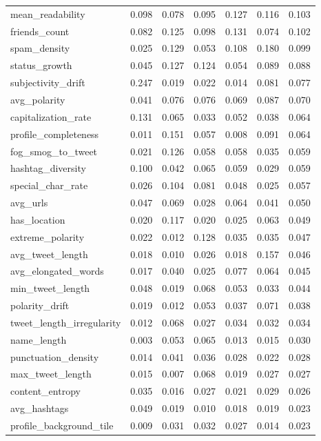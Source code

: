 \begin{tabular}{lrrrrrr}
mean_readability & 0.098 & 0.078 & 0.095 & 0.127 & 0.116 & 0.103 \\
friends_count & 0.082 & 0.125 & 0.098 & 0.131 & 0.074 & 0.102 \\
spam_density & 0.025 & 0.129 & 0.053 & 0.108 & 0.180 & 0.099 \\
status_growth & 0.045 & 0.127 & 0.124 & 0.054 & 0.089 & 0.088 \\
subjectivity_drift & 0.247 & 0.019 & 0.022 & 0.014 & 0.081 & 0.077 \\
avg_polarity & 0.041 & 0.076 & 0.076 & 0.069 & 0.087 & 0.070 \\
capitalization_rate & 0.131 & 0.065 & 0.033 & 0.052 & 0.038 & 0.064 \\
profile_completeness & 0.011 & 0.151 & 0.057 & 0.008 & 0.091 & 0.064 \\
fog_smog_to_tweet & 0.021 & 0.126 & 0.058 & 0.058 & 0.035 & 0.059 \\
hashtag_diversity & 0.100 & 0.042 & 0.065 & 0.059 & 0.029 & 0.059 \\
special_char_rate & 0.026 & 0.104 & 0.081 & 0.048 & 0.025 & 0.057 \\
avg_urls & 0.047 & 0.069 & 0.028 & 0.064 & 0.041 & 0.050 \\
has_location & 0.020 & 0.117 & 0.020 & 0.025 & 0.063 & 0.049 \\
extreme_polarity & 0.022 & 0.012 & 0.128 & 0.035 & 0.035 & 0.047 \\
avg_tweet_length & 0.018 & 0.010 & 0.026 & 0.018 & 0.157 & 0.046 \\
avg_elongated_words & 0.017 & 0.040 & 0.025 & 0.077 & 0.064 & 0.045 \\
min_tweet_length & 0.048 & 0.019 & 0.068 & 0.053 & 0.033 & 0.044 \\
polarity_drift & 0.019 & 0.012 & 0.053 & 0.037 & 0.071 & 0.038 \\
tweet_length_irregularity & 0.012 & 0.068 & 0.027 & 0.034 & 0.032 & 0.034 \\
name_length & 0.003 & 0.053 & 0.065 & 0.013 & 0.015 & 0.030 \\
punctuation_density & 0.014 & 0.041 & 0.036 & 0.028 & 0.022 & 0.028 \\
max_tweet_length & 0.015 & 0.007 & 0.068 & 0.019 & 0.027 & 0.027 \\
content_entropy & 0.035 & 0.016 & 0.027 & 0.021 & 0.029 & 0.026 \\
avg_hashtags & 0.049 & 0.019 & 0.010 & 0.018 & 0.019 & 0.023 \\
profile_background_tile & 0.009 & 0.031 & 0.032 & 0.027 & 0.014 & 0.023 \\

\end{tabular}
